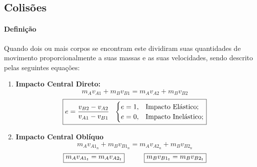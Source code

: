 \documentclass{article}
\begin{document}
        \subsection{Colisões}
            \paragraph{Definição}Quando dois ou mais corpos se encontram este dividiram suas quantidades de movimento proporcionalmente a suas massas e as suas velocidades, sendo descrito pelas seguintes equações:
                \begin{enumerate}[noitemsep]
                    \item \textbf{Impacto Central Direto:}
                        \begin{equation}
                            \boxed{
                                m_{A}v_{A1} + m_{B}v_{B1} = m_{A}v_{A2} + m_{B}v_{B2}
                            }
                        \end{equation}
                        \begin{equation}
                            \boxed{
                                e = \frac{v_{B2} - v_{A2}}{v_{A1} - v_{B1}}
                                \hspace{2.5mm}
                                \begin{cases}
                                    e = 1, & \text{Impacto Elástico};\\
                                    e = 0, & \text{Impacto Inelástico};\\
                                \end{cases}
                            }
                        \end{equation}
                    \item \textbf{Impacto Central Oblíquo}
                        \begin{equation}
                            \boxed{
                                m_{A}v_{A1_{n}} + m_{B}v_{B1_{n}} = m_{A}v_{A2_{n}} + m_{B}v_{B2_{n}}
                            }
                        \end{equation}
                        \begin{equation}
                            \boxed{m_{A}v_{A1_{t}} = m_{A}v_{A2_{t}}}
                            \hspace{10mm}
                            \boxed{m_{B}v_{B1_{t}} = m_{B}v_{B2_{t}}}
                        \end{equation}

\end{enumerate}
\end{document}
